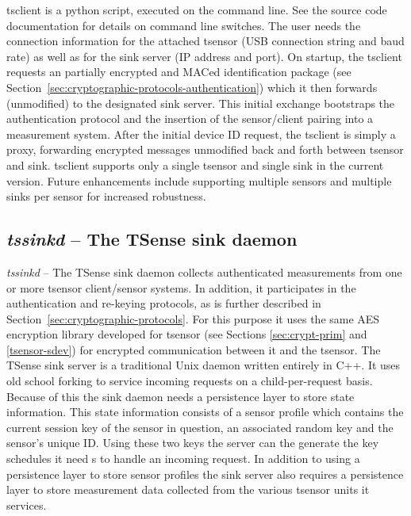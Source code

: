 tsclient is a python script, executed on the command line. See the source code documentation for details on command line switches. The user needs the connection information for the attached tsensor (USB connection string and baud rate) as well as for the sink server (IP address and port). On startup, the tsclient requests an partially encrypted and MACed identification package (see Section~\ref{sec:cryptographic-protocols-authentication}) which it then forwards (unmodified) to the designated sink server. This initial exchange bootstraps the authentication protocol and the insertion of the sensor/client pairing into a measurement system. After the initial device ID request, the tsclient is simply a proxy, forwarding encrypted messages unmodified back and forth between tsensor and sink. tsclient supports only a single tsensor and single sink in the current version. Future enhancements include supporting multiple sensors and multiple sinks per sensor for increased robustness.

\subsection{\textit{tssinkd} -- The TSense sink daemon}

\textit{tssinkd} -- The TSense sink daemon collects authenticated measurements from one or more tsensor client/sensor systems. In addition, it participates in the authentication and re-keying protocols, as is further described in Section~\ref{sec:cryptographic-protocols}.  For this purpose it uses the same AES encryption library developed for tsensor (see Sections \ref{sec:crypt-prim} and \ref{tsensor-sdev}) for encrypted communication between it and the tsensor.  The TSense sink server is a traditional Unix daemon written entirely in C++. It uses old school forking to service incoming requests on a child-per-request basis. Because of this the sink daemon needs a persistence layer to store state information. This state information consists of a sensor profile which contains the current session key of the sensor in question, an associated random key and the sensor's unique ID. Using these two keys the server can the generate the key schedules it need s to handle an incoming request. In addition to using a persistence layer to store sensor profiles the sink server  also requires a persistence layer to store measurement data collected from the various tsensor units it services.\\


